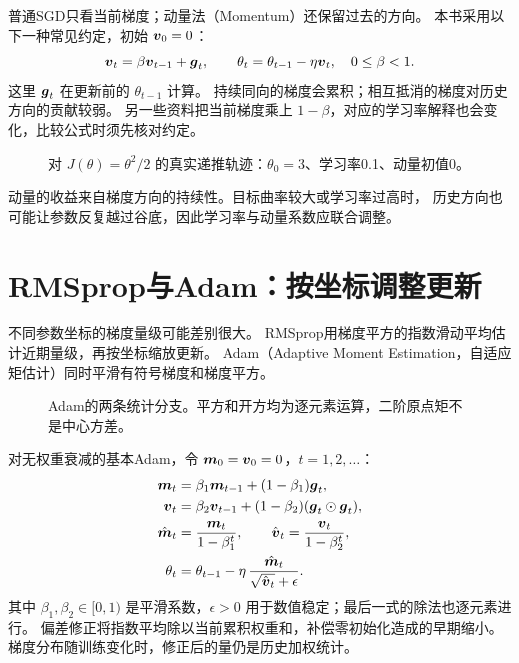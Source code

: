 普通SGD只看当前梯度；动量法（Momentum）还保留过去的方向。
本书采用以下一种常见约定，初始 $\boldsymbol{v}_0=0$：
\begin{equation}
 \boldsymbol{v}_t=\beta\boldsymbol{v}_{t-1}+\boldsymbol{g}_t,\qquad
 \theta_t=\theta_{t-1}-\eta\boldsymbol{v}_t,\quad 0\leq\beta<1.
 \label{eq:train-momentum}
\end{equation}
这里 $\boldsymbol{g}_t$ 在更新前的 $\theta_{t-1}$ 计算。
持续同向的梯度会累积；相互抵消的梯度对历史方向的贡献较弱。
另一些资料把当前梯度乘上 $1-\beta$，对应的学习率解释也会变化，比较公式时须先核对约定。

\begin{figure}[htbp]
\centering

\caption{对 $J(\theta)=\theta^2/2$ 的真实递推轨迹：$\theta_0=3$、学习率0.1、动量初值0。}
\label{fig:train-momentum}
\par\smallskip
{}
\end{figure}

动量的收益来自梯度方向的持续性。目标曲率较大或学习率过高时，
历史方向也可能让参数反复越过谷底，因此学习率与动量系数应联合调整。

\section{RMSprop与Adam：按坐标调整更新}
\label{sec:train-adam}

不同参数坐标的梯度量级可能差别很大。
RMSprop用梯度平方的指数滑动平均估计近期量级，再按坐标缩放更新。
Adam（Adaptive Moment Estimation，自适应矩估计）同时平滑有符号梯度和梯度平方。

\begin{figure}[htbp]
\centering

\caption{Adam的两条统计分支。平方和开方均为逐元素运算，二阶原点矩不是中心方差。}
\label{fig:train-adam}
\par\smallskip
{}
\end{figure}

对无权重衰减的基本Adam，令 $\boldsymbol{m}_0=\boldsymbol{v}_0=0$，$t=1,2,\ldots$：
\begin{align}
 \boldsymbol{m}_t&=\beta_1\boldsymbol{m}_{t-1}+(1-\beta_1)\boldsymbol{g}_t,\label{eq:train-adam-m}\\
 \boldsymbol{v}_t&=\beta_2\boldsymbol{v}_{t-1}+(1-\beta_2)(\boldsymbol{g}_t\odot\boldsymbol{g}_t),\\
 \hat{\boldsymbol{m}}_t&=\frac{\boldsymbol{m}_t}{1-\beta_1^t},\qquad
 \hat{\boldsymbol{v}}_t=\frac{\boldsymbol{v}_t}{1-\beta_2^t},\\
 \theta_t&=\theta_{t-1}-\eta\,
  \frac{\hat{\boldsymbol{m}}_t}{\sqrt{\hat{\boldsymbol{v}}_t}+\epsilon}.
 \label{eq:train-adam-update}
\end{align}
其中 $\beta_1,\beta_2\in[0,1)$ 是平滑系数，$\epsilon>0$ 用于数值稳定；最后一式的除法也逐元素进行。
偏差修正将指数平均除以当前累积权重和，补偿零初始化造成的早期缩小。
梯度分布随训练变化时，修正后的量仍是历史加权统计。

